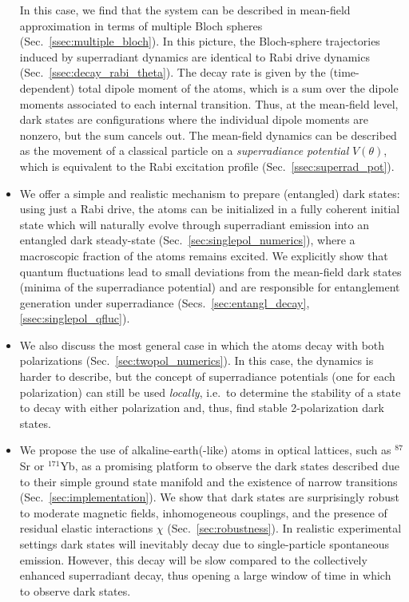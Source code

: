 \documentclass[aps,prx,superscriptaddress,twocolumn,notitlepage,nofootinbib,longbibliography]{revtex4-2}
\begin{document}
\begin{itemize}
In this case, we find that the system can be described in mean-field approximation in terms of multiple Bloch spheres (Sec.~\ref{ssec:multiple_bloch}). In this picture, the Bloch-sphere trajectories induced by superradiant dynamics are identical to Rabi drive dynamics (Sec.~\ref{ssec:decay_rabi_theta}).
The decay rate is given by the (time-dependent) total dipole moment of the atoms, which is a sum over the dipole moments associated to each internal transition. Thus, at the mean-field level, dark states are configurations where the individual dipole moments are nonzero, but the sum cancels out.
The mean-field dynamics can be described as the movement of a classical particle on a \emph{superradiance potential} $V(\theta)$, which is equivalent to the Rabi excitation profile (Sec.~\ref{ssec:superrad_pot}).

\item  We offer a simple and realistic mechanism to prepare (entangled) dark states: using just a Rabi drive, the atoms can be initialized in
a fully coherent initial state  which will naturally evolve through superradiant emission into an entangled dark steady-state (Sec.~\ref{sec:singlepol_numerics}), where a macroscopic fraction of the atoms remains excited.
We explicitly show that quantum fluctuations lead to small deviations from the mean-field dark states (minima of the superradiance  potential) and are responsible for entanglement generation under superradiance (Secs.~\ref{sec:entangl_decay}, \ref{ssec:singlepol_qfluc}).




\item We also discuss the most general case in which  the atoms decay with both polarizations (Sec.~\ref{sec:twopol_numerics}). In this case, the dynamics is harder to describe, but the concept of superradiance potentials (one for each polarization) can still be used \emph{locally}, i.e.~to determine the stability of a state to decay with either polarization and, thus, find stable 2-polarization dark states.



\item We propose the use of alkaline-earth(-like) atoms in optical lattices, such as $^{87}$Sr or $^{171}$Yb, as a promising platform to observe the dark states described due to their simple ground state manifold and the existence of narrow transitions (Sec.~\ref{sec:implementation}).
We show that dark states are surprisingly robust to moderate magnetic fields, inhomogeneous couplings, and the presence of residual elastic  interactions $\chi$ (Sec.~\ref{sec:robustness}).
In realistic experimental settings dark states will inevitably decay due to single-particle spontaneous emission. However, this decay will be slow compared to the collectively enhanced superradiant decay, thus opening a large window of time in which to observe dark states.


\end{itemize}
\end{document}
